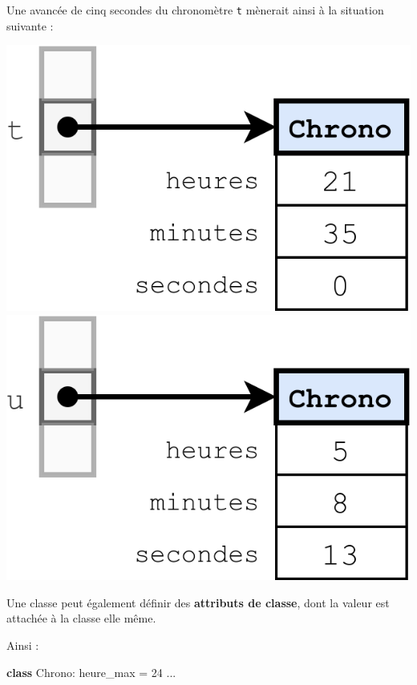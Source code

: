 \documentclass[a4paper,17pt]{extarticle}
\newenvironment{Shaded}{}{}
\newcommand{\KeywordTok}[1]{\textcolor[rgb]{0.00,0.44,0.13}{\textbf{{#1}}}}
\newcommand{\DecValTok}[1]{\textcolor[rgb]{0.25,0.63,0.44}{{#1}}}
\newcommand{\NormalTok}[1]{{#1}}
\newcommand{\OperatorTok}[1]{\textcolor[rgb]{0.40,0.40,0.40}{{#1}}}
\begin{document}
\begin{exemple}
Une avancée de cinq secondes du chronomètre \texttt{t} mènerait ainsi à
la situation suivante :

\includegraphics{res/chrono03.png} \includegraphics{res/chrono02.png}

        \end{exemple}\begin{retenir}
    Une classe peut également définir des \textbf{attributs de classe}, dont
la valeur est attachée à la classe elle même.

        \end{retenir}\begin{exemple}
    Ainsi :

\begin{Shaded}
\begin{Highlighting}[]
\KeywordTok{class}\NormalTok{ Chrono:}
\NormalTok{    heure\_max }\OperatorTok{=} \DecValTok{24}
\NormalTok{    ...}
\end{Highlighting}
\end{Shaded}


\end{exemple}
\end{document}
